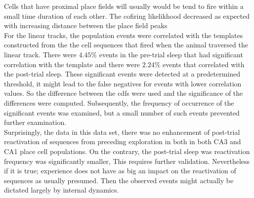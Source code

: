 

Cells that have proximal place fields will usually would be tend to fire within a small time duration of each other. The cofiring likelikhood decreased as expected with increasing distance between the place field peaks \\

For the linear tracks, the population events were correlated with the templates constructed from the the cell sequences that fired when the animal traversed the linear track. There were $4.45 \% $ events in the pre-trial sleep that had significant correlation with the template and there were $ 2.24 \% $  events that correlated with the post-trial sleep. These significant events were detected at a predetermined threshold, it might lead to the false negatives for events with lower correlation values. So the difference between the cdfs were used and the significance of the differences were computed. Subsequently, the frequency of occurrence of the significant events was examined, but a small number of such events prevented further examination.\\ Surprisingly, the data in this data set, there was no enhancement of post-trial reactivation of sequences from preceding exploration in both in both CA3 and CA1 place cell populations. On the contrary, the post-trial sleep was reactivation frequency was significantly smaller, This requires further validation. Nevertheless if it is true; experience does not have as big an impact on the reactivation of sequences as usually presumed. Then the observed events might actually be dictated largely by internal dynamics. 


